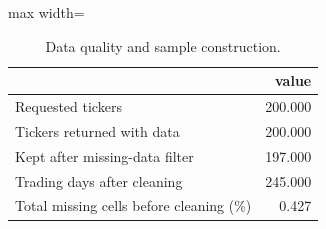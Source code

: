 \begin{table}
\centering
\caption{Data quality and sample construction.}
\label{tab:data_quality}
\begin{adjustbox}{max width=\textwidth}
\begin{tabular}{lr}
\toprule
 & value \\
\midrule
Requested tickers & 200.000 \\
Tickers returned with data & 200.000 \\
Kept after missing-data filter & 197.000 \\
Trading days after cleaning & 245.000 \\
Total missing cells before cleaning (\%) & 0.427 \\
\bottomrule
\end{tabular}
\end{adjustbox}
\end{table}
